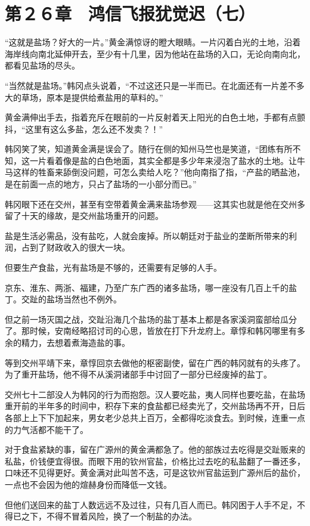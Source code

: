 \section{第２６章　鸿信飞报犹觉迟（七）}

“这就是盐场？好大的一片。”黄金满惊讶的瞪大眼睛。一片闪着白光的土地，沿着海岸线向南北延伸开去，至少有十几里，因为他站在盐场的入口，无论向南向北，都看见盐场的尽头。

“当然就是盐场。”韩冈点头说着，“不过这还只是一半而已。在北面还有一片差不多大的草场，原本是提供给煮盐用的草料的。”

黄金满伸出手去，指着充斥在眼前的一片反射着天上阳光的白色土地，手都有点颤抖，“这里有这么多盐，怎么还不发卖？！”

韩冈笑了笑，知道黄金满是误会了。随行在侧的知州马竺也是笑道，“团练有所不知，这一片看着像是盐的白色地面，其实全都是多少年来浸泡了盐水的土地。让牛马这样的牲畜来舔倒没问题，可怎么卖给人吃？”他向南指了指，“产盐的晒盐池，是在前面一点的地方，只占了盐场的一小部分而已。”

韩冈眼下还在交州，甚至有空带着黄金满来盐场参观——这其实也就是他在交州多留了十天的缘故，是交州盐场重开的问题。

盐是生活必需品，没有盐吃，人就会废掉。所以朝廷对于盐业的垄断所带来的利润，占到了财政收入的很大一块。

但要生产食盐，光有盐场是不够的，还需要有足够的人手。

京东、淮东、两浙、福建，乃至广东广西的诸多盐场，哪一座没有几百上千的盐丁。交趾的盐场当然也不例外。

但之前一场灭国之战，交趾沿海几个盐场的盐丁基本上都是各家溪洞蛮部给瓜分了。那时候，安南经略招讨司的心思，皆放在打下升龙府上。章惇和韩冈哪里有多余的精力，去想着煮海造盐的事。

等到交州平靖下来，章惇回京去做他的枢密副使，留在广西的韩冈就有的头疼了。为了重开盐场，他不得不从溪洞诸部手中讨回了一部分已经废掉的盐丁。

交州七十二部没人为韩冈的行为而抱怨。汉人要吃盐，夷人同样也要吃盐，在盐场重开前的半年多的时间中，积存下来的食盐都已经卖光了，交州盐场再不开，日后各部上上下下加起来，男女老少总共上百万，全都得吃淡食去。到时候，连重一点的力气活都不能干了。

对于食盐紧缺的事，留在广源州的黄金满都急了。他的部族过去吃得是交趾贩来的私盐，价钱便宜得很。而眼下用的钦州官盐，价格比过去吃的私盐翻了一番还多，口味还不见得更好。黄金满对此叫苦不迭，可是这钦州官盐运到广源州后的盐价，一点也不会因为他的煊赫身份而降低一文钱。

但他们送回来的盐丁人数远远不及过往，只有几百人而已。韩冈困于人手不足，不得已之下，不得不冒着风险，换了一个制盐的办法。

